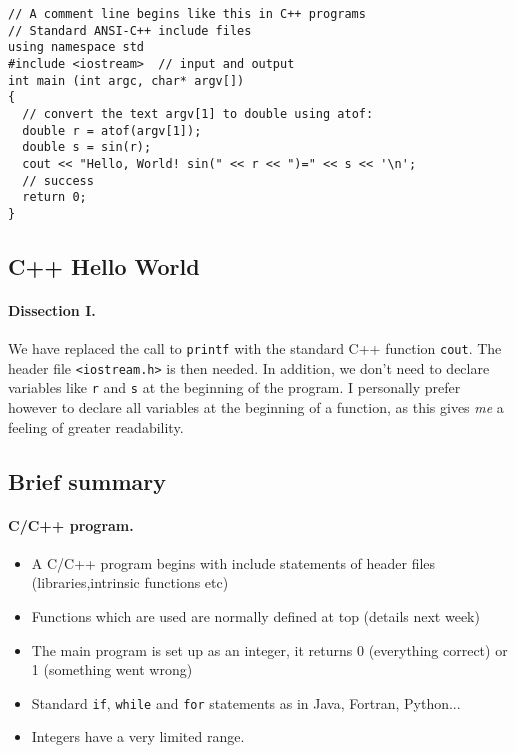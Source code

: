 \documentclass[%
oneside,                 %
final,                   %
10pt]{article}
\begin{document}
\begin{verbatim}
// A comment line begins like this in C++ programs
// Standard ANSI-C++ include files
using namespace std
#include <iostream>  // input and output
int main (int argc, char* argv[])
{
  // convert the text argv[1] to double using atof:
  double r = atof(argv[1]);
  double s = sin(r);
  cout << "Hello, World! sin(" << r << ")=" << s << '\n';
  // success
  return 0;
}
\end{verbatim}



\subsection*{C++ Hello World}


\paragraph{Dissection I.}
We have replaced the call to \Verb!printf! with the standard C++ function
\Verb!cout!. The header file \Verb!<iostream.h>! is then needed.
In addition, we don't need to
declare variables like \Verb!r! and \Verb!s!  at the beginning of the program.
I personally prefer
however to declare all variables at the beginning of a function, as this
gives \emph{me} a feeling of greater readability.



\subsection*{Brief summary}


\paragraph{C/C++ program.}
\begin{itemize}
  \item A C/C++ program begins with include statements of header files (libraries,intrinsic functions etc)

  \item Functions which are used are normally defined at top (details next week)

  \item The main program is set up as an integer, it returns 0 (everything correct) or 1 (something went wrong)

  \item Standard \Verb!if!, \Verb!while! and \Verb!for! statements as in Java, Fortran, Python...

  \item Integers have a very limited range.
\end{itemize}
\end{document}
